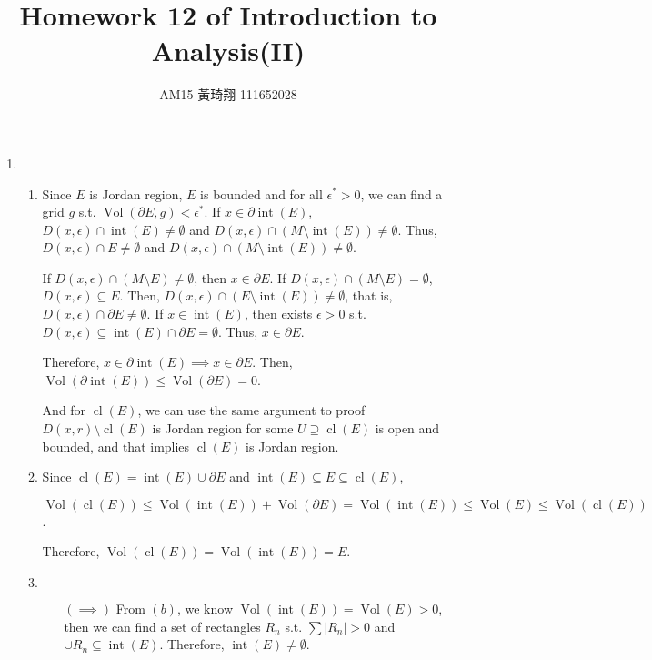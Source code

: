\documentclass[12pt]{article}
\title{Homework 12 of Introduction to Analysis(II)}
\author{AM15 黃琦翔 111652028}
\DeclareMathOperator{\volume}{Vol}
\DeclareMathOperator{\interior}{int}
\DeclareMathOperator{\closure}{cl}
\newcommand{\boundary}{\partial}
\begin{document}
\maketitle
\begin{enumerate}
    \item \begin{enumerate}
        \item Since $E$ is Jordan region, $E$ is bounded and for all $\epsilon^* > 0$, we can find a grid $g$ s.t. $\volume(\boundary E, g) < \epsilon^*$.
        If $x\in \boundary\interior(E)$, $D(x, \epsilon) \cap \interior(E) \neq \emptyset$ and $D(x, \epsilon) \cap (M\setminus \interior(E)) \neq \emptyset$.
        Thus, $D(x, \epsilon)\cap E \neq \emptyset$ and $D(x,\epsilon) \cap (M\setminus \interior(E)) \neq \emptyset$.

        If $D(x, \epsilon) \cap (M\setminus E) \neq \emptyset$, then $x\in \boundary E$.
        If $D(x, \epsilon) \cap (M\setminus E) = \emptyset$, $D(x, \epsilon) \subseteq E$.
        Then, $D(x, \epsilon) \cap (E\setminus \interior(E)) \neq \emptyset$,
        that is, $D(x, \epsilon) \cap \boundary E \neq \emptyset$.
        If $x\in \interior(E)$, then exists $\epsilon > 0$ s.t. $D(x, \epsilon) \subseteq \interior(E) \cap \boundary E = \emptyset$.
        Thus, $x \in \boundary E$.

        Therefore, $x\in \boundary \interior(E) \implies x\in \boundary E$.
        Then, $\volume(\boundary \interior(E)) \leq \volume(\boundary E) = 0$.

        And for $\closure(E)$, we can use the same argument to proof $D(x, r)\setminus \closure(E)$ is Jordan region for some $U\supseteq \closure(E)$ is open and bounded,
        and that implies $\closure(E)$ is Jordan region.

        \item Since $\closure(E) = \interior(E) \cup \boundary E$ and $\interior(E)\subseteq E \subseteq \closure(E)$,

        $\volume(\closure(E)) \leq \volume(\interior(E)) + \volume(\boundary E) = \volume(\interior(E))\leq \volume(E) \leq \volume(\closure(E))$.

        Therefore, $\volume(\closure(E)) = \volume(\interior(E)) = E$.

        \item $\ $
        \begin{enumerate}
            \item[$(\implies)$] From $(b)$, we know $\volume(\interior(E)) = \volume(E) > 0$, 
            then we can find a set of rectangles $R_n$ s.t. $\sum |R_n| > 0$ and $\cup R_n \subseteq \interior(E)$.
            Therefore, $\interior(E) \neq \emptyset$.


\end{enumerate}
\end{enumerate}
\end{enumerate}
\end{document}
